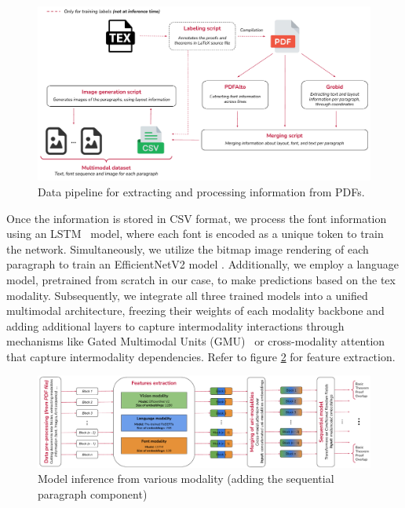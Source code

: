 \documentclass[runningheads]{llncs}
\begin{document}
\begin{figure}[h]
    \centering
    \includegraphics[width=\textwidth]{images/preprocessing.pdf}
    \caption{Data pipeline for extracting and processing information from PDFs.}
    \label{fig:datapipeline}
\end{figure}

Once the information is stored in CSV format, we process the font information using an LSTM~\cite{hochreiter1997long} model, where 
each font is encoded as a unique token to train the network. Simultaneously, we utilize the bitmap image 
rendering of each paragraph to train an EfficientNetV2 model \cite{efficientnet}. Additionally, we employ a language model, 
pretrained from scratch in our case, to make predictions based on the tex modality. Subsequently, we 
integrate all three trained models into a unified multimodal architecture, freezing their weights of each modality backbone and adding 
additional layers to capture intermodality interactions through mechanisms like Gated Multimodal Units 
(GMU)~\cite{arevalo2020gated} or cross-modality attention that capture intermodality dependencies. Refer to figure \ref{fig:generalpipeline} for feature extraction.


\begin{figure}[h]
    \centering
    \includegraphics[width=\textwidth]{images/general_pipeline.pdf}
    \caption{Model inference from various modality (adding the sequential paragraph component)}
    \label{fig:generalpipeline}
\end{figure}
\end{document}
